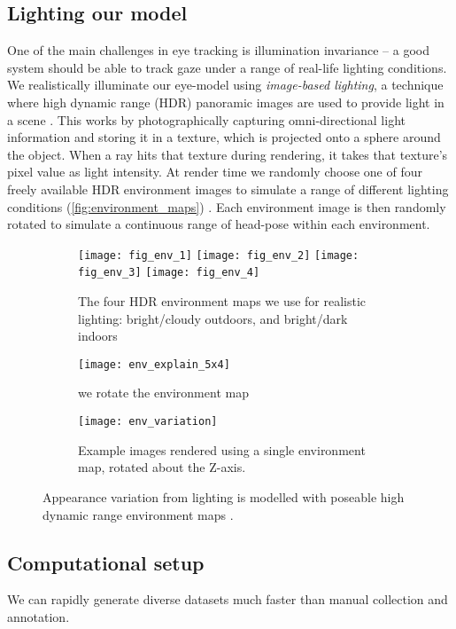 \subsection{Lighting our model}

One of the main challenges in eye tracking is illumination invariance -- a good system should be able to track gaze under a range of real-life lighting conditions.
%
We realistically illuminate our eye-model using \emph{image-based lighting}, a technique where high dynamic range (HDR) panoramic images are used to provide light in a scene \cite{debevec2002image}. This works by photographically capturing omni-directional light information and storing it in a texture, which is projected onto a sphere around the object. When a ray hits that texture during rendering, it takes that texture's pixel value as light intensity.
%
At render time we randomly choose one of four freely available HDR environment images to simulate a range of different lighting conditions (\autoref{fig:environment_maps}) \cite{AdaptiveSamplesHDR}. Each environment image is then randomly rotated to simulate a continuous range of head-pose within each environment.

\begin{figure}

    \begin{subfigure}[t]{\columnwidth}
        \texttt{[image: fig\_env\_1]} \hfill
    	\texttt{[image: fig\_env\_2]} \hfill
        \texttt{[image: fig\_env\_3]} \hfill
    	\texttt{[image: fig\_env\_4]}
	    \caption{The four HDR environment maps we use for realistic lighting: bright/cloudy outdoors, and bright/dark indoors}
    \end{subfigure}
    \par \medskip
    \begin{subfigure}[t]{0.48\columnwidth}
        \texttt{[image: env\_explain\_5x4]}
    	\caption{we rotate the environment map}
    \end{subfigure}%
    \hfill
    \begin{subfigure}[t]{0.48\columnwidth}
        \texttt{[image: env\_variation]}
        \caption{Example images rendered using a single environment map, rotated about the Z-axis.}
    \end{subfigure}
    \caption{Appearance variation from lighting is modelled with poseable high dynamic range environment maps \cite{debevec2002image}.}
    \label{fig:environment_maps}
\end{figure}

\subsection{Computational setup}

We can rapidly generate diverse datasets much faster than manual collection and annotation.